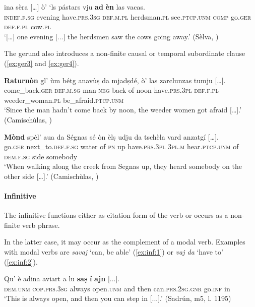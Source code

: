 \ea\label{ex:ger2}
\gll   [...] ina sèra […] ò’ ‘ls pástars vju \textbf{ad} \textbf{èn} las vacas.\\
{} \textsc{indef.f.sg} evening {} have.\textsc{prs.3sg} \textsc{def.m.pl} herdsman.\textsc{pl} see.\textsc{ptcp.unm} \textsc{comp} go.\textsc{ger} \textsc{def.f.pl} cow.\textsc{pl} \\
\glt `[…] one evening [...] the herdsmen saw the cows going away.' (Sèlva, \citealt[28]{Büchli1966})
\z

The gerund also introduces a non-finite causal or temporal subordinate clause (\ref{ex:ger3} and \ref{ex:ger4}).

\ea\label{ex:ger3}
\gll   \textbf{Raturnòn} gl' ùm bétg anavùṣ da mjadṣdé, ò’ las zarclunzas tumju […].\\
come\_back.\textsc{ger} \textsc{def.m.sg} man \textsc{neg} back of noon have.\textsc{prs.3pl} \textsc{def.f.pl} weeder\_woman.\textsc{pl} be\_afraid.\textsc{ptcp.unm}\\
\glt `Since the man hadn’t come back by noon, the weeder women got afraid […].' (Camischùlas, \citealt[82]{Büchli1966})
\z

\ea\label{ex:ger4}
\gll    \textbf{Mònd} spèl’ aua da Ségnas sé òn èlṣ udju da tschèla vard anzatgí […].\\
     go.\textsc{ger} next\_to.\textsc{def.f.sg} water of  \textsc{pn} up have.\textsc{prs.3pl} \textsc{3pl.m} hear.\textsc{ptcp.unm} of \textsc{dem.f.sg} side somebody \\
\glt `When walking along the creek from Segnas up, they heard somebody on the other side […].' (Camischùlas, \citealt[88]{Büchli1966})
\z


\paragraph{Infinitive}
The infinitive functions either as citation form of the verb or occurs as a non-finite verb phrase.

In the latter case, it may occur as the complement of a modal verb. Examples with modal verbs are \textit{savaj} `can, be able' (\ref{ex:inf:1}) or \textit{vaj da} `have to' (\ref{ex:inf:2}).

\ea\label{ex:inf:1}
\gll  Qu’ è adina aviart a lu \textbf{saṣ} \textbf{í} \textbf{ajn} [...].\\
\textsc{dem.unm} \textsc{cop.prs.3sg} always open.\textsc{unm} and then can.\textsc{prs.2sg.gnr} go.\textsc{inf} in\\
\glt `This is always open, and then you can step in [...].' (Sadrún, m5, l. 1195)
\z

